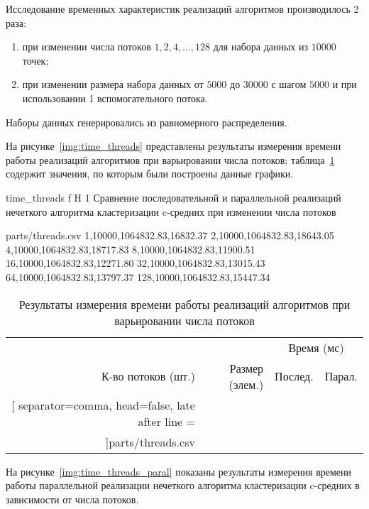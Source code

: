 Исследование временных характеристик реализаций алгоритмов производилось 2 раза:
\begin{enumerate}
	\item при изменении числа потоков $1, 2, 4, \dots, 128$ для набора данных из $10000$ точек;
	\item при изменении размера набора данных от $5000$ до $30000$ с шагом $5000$ и при использовании 1 вспомогательного потока.
\end{enumerate}

Наборы данных генерировались из равномерного распределения.

На рисунке~\ref{img:time_threads} представлены результаты измерения времени работы реализаций алгоритмов при варьировании числа потоков; таблица~\ref{tbl:time_threads} содержит значения, по которым были построены данные графики.

	{time_threads}
	{f}
	{H}
	{1\textwidth}
	{Сравнение последовательной и параллельной реализаций нечеткого алгоритма кластеризации c-средних при изменении числа потоков}
	
\begin{filecontents*}{parts/threads.csv}
	1,10000,1064832.83,16832.37
	2,10000,1064832.83,18643.05
	4,10000,1064832.83,18717.83
	8,10000,1064832.83,11900.51
	16,10000,1064832.83,12271.80
	32,10000,1064832.83,13015.43
	64,10000,1064832.83,13797.37
	128,10000,1064832.83,15447.34
\end{filecontents*}

\begin{table}[H]
	\centering
	\caption{Результаты измерения времени работы реализаций алгоритмов при варьировании числа потоков}
	\label{tbl:time_threads}
	\begin{tabular}{|r|r|r|r|}
		\hline
		~ & ~ & \multicolumn{2}{c|}{Время (мс)} \\
		\cline{3-4}
		К-во потоков (шт.) & Размер (элем.) & Послед{.} & Парал{.} \\ \hline
		\csvreader[
			separator=comma,
			head=false,
			late after line = \\\hline
		]{parts/threads.csv}{}{%
			\csvcoli & \csvcolii & \csvcoliii & \csvcoliv 
		}
	\end{tabular}
\end{table}

На рисунке~\ref{img:time_threads_paral} показаны результаты измерения времени работы параллельной реализации нечеткого алгоритма кластеризации c-средних в зависимости от числа потоков.

